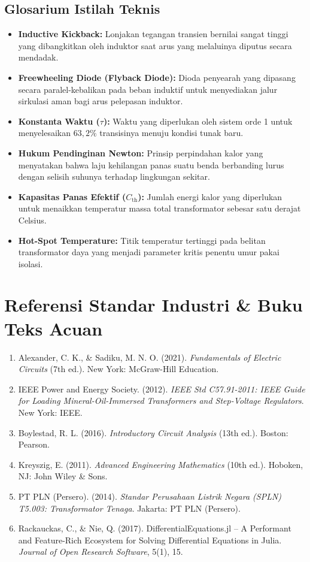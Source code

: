 \documentclass[11pt,a4paper]{article}
\theoremstyle{definition}
\begin{document}
\subsection{Glosarium Istilah Teknis}
\begin{itemize}[leftmargin=*]
    \item \textbf{Inductive Kickback:} Lonjakan tegangan transien bernilai sangat tinggi yang dibangkitkan oleh induktor saat arus yang melaluinya diputus secara mendadak.
    \item \textbf{Freewheeling Diode (Flyback Diode):} Dioda penyearah yang dipasang secara paralel-kebalikan pada beban induktif untuk menyediakan jalur sirkulasi aman bagi arus pelepasan induktor.
    \item \textbf{Konstanta Waktu ($\tau$):} Waktu yang diperlukan oleh sistem orde 1 untuk menyelesaikan $63{,}2\%$ transisinya menuju kondisi tunak baru.
    \item \textbf{Hukum Pendinginan Newton:} Prinsip perpindahan kalor yang menyatakan bahwa laju kehilangan panas suatu benda berbanding lurus dengan selisih suhunya terhadap lingkungan sekitar.
    \item \textbf{Kapasitas Panas Efektif ($C_{\text{th}}$):} Jumlah energi kalor yang diperlukan untuk menaikkan temperatur massa total transformator sebesar satu derajat Celsius.
    \item \textbf{Hot-Spot Temperature:} Titik temperatur tertinggi pada belitan transformator daya yang menjadi parameter kritis penentu umur pakai isolasi.
\end{itemize}

\section{Referensi Standar Industri \& Buku Teks Acuan}
\begin{enumerate}[leftmargin=*]
    \item Alexander, C. K., \& Sadiku, M. N. O. (2021). \textit{Fundamentals of Electric Circuits} (7th ed.). New York: McGraw-Hill Education.
    \item IEEE Power and Energy Society. (2012). \textit{IEEE Std C57.91-2011: IEEE Guide for Loading Mineral-Oil-Immersed Transformers and Step-Voltage Regulators}. New York: IEEE.
    \item Boylestad, R. L. (2016). \textit{Introductory Circuit Analysis} (13th ed.). Boston: Pearson.
    \item Kreyszig, E. (2011). \textit{Advanced Engineering Mathematics} (10th ed.). Hoboken, NJ: John Wiley \& Sons.
    \item PT PLN (Persero). (2014). \textit{Standar Perusahaan Listrik Negara (SPLN) T5.003: Transformator Tenaga}. Jakarta: PT PLN (Persero).
    \item Rackauckas, C., \& Nie, Q. (2017). DifferentialEquations.jl -- A Performant and Feature-Rich Ecosystem for Solving Differential Equations in Julia. \textit{Journal of Open Research Software}, 5(1), 15.
\end{enumerate}
\end{document}
